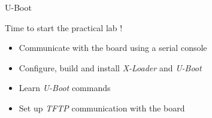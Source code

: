 \setuplabframe
{U-Boot}
{
  Time to start the practical lab !
  \begin{itemize}
  \item Communicate with the board using a serial console
  \item Configure, build and install {\em X-Loader} and {\em U-Boot}
  \item Learn {\em U-Boot} commands
  \item Set up {\em TFTP} communication with the board
  \end{itemize}
}